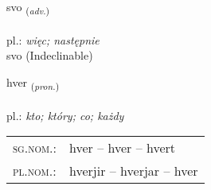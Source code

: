 \documentclass[frontgrid, backgrid]{flacards}\usepackage[]{graphicx}\usepackage[]{xcolor}
\begin{document}
\renewcommand{\blhead}{\vskip5pt {\small\bfseries\footnotesize Atviksorð | Adverb }}
\renewcommand{\bcfoot}{\vskip5pt \hspace{2pt}{\small\bfseries\footnotesize 1K}}


{svo \small{\textsubscript{(\textit{adv.})}} \\[1ex]
\textphonetic{[svɔː]} \\
pl.: \emph{więc; następnie} \\  [2ex]
svo (Indeclinable)}

\renewcommand{\flhead}{\vskip5pt \fboxsep=0pt {\small\bfseries\footnotesize Fornafn | Pronoun}}
\renewcommand{\fcfoot}{\vskip5pt \fboxsep=0pt \hspace{2pt}{\small\bfseries\footnotesize 1K}}

\renewcommand{\blhead}{\vskip5pt {\small\bfseries\footnotesize Fornafn | Pronoun }}
\renewcommand{\bcfoot}{\vskip5pt \hspace{2pt}{\small\bfseries\footnotesize 1K}}


{hver \small{\textsubscript{(\textit{pron.})}} \\[1ex] %
\textphonetic{[kʰvɛr]} \\
pl.: \emph{kto; który; co; każdy} \\  [2ex]
\renewcommand*{\arraystretch}{0.8}
\begin{tabular}{ll}
\textsc{sg.nom.}: & hver  --  hver -- hvert \\ 
\textsc{pl.nom.}: & hverjir -- hverjar -- hver
\end{tabular}
}

\renewcommand{\flhead}{\vskip5pt \fboxsep=0pt {\small\bfseries\footnotesize Sagnorð | Verb}}
\renewcommand{\fcfoot}{\vskip5pt \fboxsep=0pt \hspace{2pt}{\small\bfseries\footnotesize 1K}}

\renewcommand{\blhead}{\vskip5pt {\small\bfseries\footnotesize Sagnorð | Verb }}
\renewcommand{\bcfoot}{\vskip5pt \hspace{2pt}{\small\bfseries\footnotesize 1K}}
\end{document}
